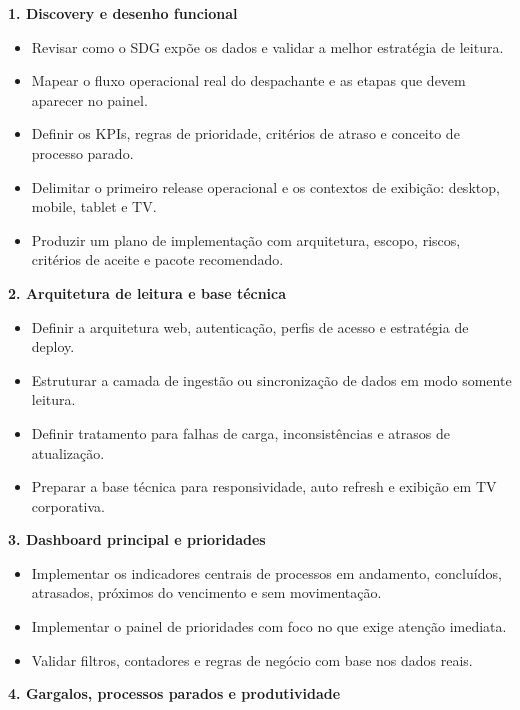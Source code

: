 \documentclass[11pt,a4paper]{article}
\begin{document}
\textbf{1. Discovery e desenho funcional}\par

\begin{itemize}
\item Revisar como o SDG expõe os dados e validar a melhor estratégia de leitura.
\item Mapear o fluxo operacional real do despachante e as etapas que devem aparecer no painel.
\item Definir os KPIs, regras de prioridade, critérios de atraso e conceito de processo parado.
\item Delimitar o primeiro release operacional e os contextos de exibição: desktop, mobile, tablet e TV.
\item Produzir um plano de implementação com arquitetura, escopo, riscos, critérios de aceite e pacote recomendado.
\end{itemize}

\textbf{2. Arquitetura de leitura e base técnica}\par

\begin{itemize}
\item Definir a arquitetura web, autenticação, perfis de acesso e estratégia de deploy.
\item Estruturar a camada de ingestão ou sincronização de dados em modo somente leitura.
\item Definir tratamento para falhas de carga, inconsistências e atrasos de atualização.
\item Preparar a base técnica para responsividade, auto refresh e exibição em TV corporativa.
\end{itemize}

\textbf{3. Dashboard principal e prioridades}\par

\begin{itemize}
\item Implementar os indicadores centrais de processos em andamento, concluídos, atrasados, próximos do vencimento e sem movimentação.
\item Implementar o painel de prioridades com foco no que exige atenção imediata.
\item Validar filtros, contadores e regras de negócio com base nos dados reais.
\end{itemize}

\textbf{4. Gargalos, processos parados e produtividade}\par
\end{document}
